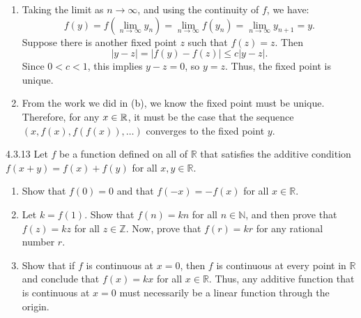 {\begin{enumerate}
{              %
              }
              \newpage
        \item Taking the limit as \(n \to \infty\), and using the continuity of \(f\), we have:
              \[
                  f(y) = f\left( \lim_{n \to \infty} y_n \right) = \lim_{n \to \infty} f(y_n) = \lim_{n \to \infty} y_{n+1} = y.
              \]
              Suppose there is another fixed point \(z\) such that \(f(z) = z\). Then
              \[
                  |y - z| = |f(y) - f(z)| \leq c|y - z|.
              \]
              Since \(0 < c < 1\), this implies \(y - z = 0\), so \(y = z\). Thus, the fixed point is unique.
        \item From the work we did in (b), we know the fixed point must be unique. Therefore, for any \(x \in \mathbb{R}\), it must be the case that the sequence \((x, f(x), f(f(x)), \ldots)\) converges to the fixed point \(y\).
    \end{enumerate}
}

\begin{exercise}
    {4.3.13} Let \(f\) be a function defined on all of \(\mathbb{R}\) that satisfies the additive condition \(f(x + y) = f(x) + f(y)\) for all \(x, y \in \mathbb{R}\).
    \begin{enumerate}
        \item Show that \(f(0) = 0\) and that \(f(-x) = -f(x)\) for all \(x \in \mathbb{R}\).
        \item Let \(k = f(1)\). Show that \(f(n) = kn\) for all \(n \in \mathbb{N}\), and then prove that \(f(z) = kz\) for all \(z \in \mathbb{Z}\). Now, prove that \(f(r) = kr\) for any rational number \(r\).
        \item Show that if \(f\) is continuous at \(x = 0\), then \(f\) is continuous at every point in \(\mathbb{R}\) and conclude that \(f(x) = kx\) for all \(x \in \mathbb{R}\). Thus, any additive function that is continuous at \(x = 0\) must necessarily be a linear function through the origin.
    \end{enumerate}
\end{exercise}

